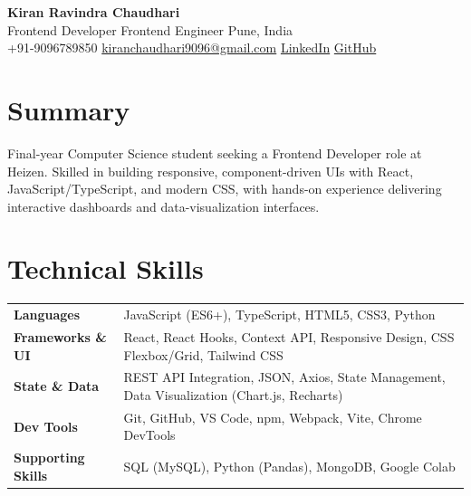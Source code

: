 \documentclass[10pt, letterpaper]{article}
\begin{document}
\pagestyle{empty}

\begin{center}
  {\fontsize{21}{25}\selectfont\bfseries\color{navy} Kiran Ravindra Chaudhari}\\[3pt]
  {\small\color{darkgray}%
    Frontend Developer \enspace\textbar\enspace
    Frontend Engineer \enspace\textbar\enspace
    Pune, India}\\[4pt]
  {\small
    +91-9096789850 \enspace\textbar\enspace
    \href{mailto:kiranchaudhari9096@gmail.com}{kiranchaudhari9096@gmail.com} \enspace\textbar\enspace
    \href{https://www.linkedin.com/in/kiran-chaudhari-10463925b}{LinkedIn} \enspace\textbar\enspace
    \href{https://github.com/Kiran2504}{GitHub}
  }
\end{center}


\section{Summary}

Final-year Computer Science student seeking a Frontend Developer role at Heizen. Skilled in building responsive, component-driven UIs with React, JavaScript/TypeScript, and modern CSS, with hands-on experience delivering interactive dashboards and data-visualization interfaces.

\section{Technical Skills}

\begin{tabularx}{\linewidth}{@{}>{\bfseries\small}p{3.8cm} X@{}}
Languages           & JavaScript (ES6+), TypeScript, HTML5, CSS3, Python \\[3pt]
Frameworks \& UI    & React, React Hooks, Context API, Responsive Design, CSS Flexbox/Grid, Tailwind CSS \\[3pt]
State \& Data       & REST API Integration, JSON, Axios, State Management, Data Visualization (Chart.js, Recharts) \\[3pt]
Dev Tools           & Git, GitHub, VS Code, npm, Webpack, Vite, Chrome DevTools \\[3pt]
Supporting Skills   & SQL (MySQL), Python (Pandas), MongoDB, Google Colab \\
\end{tabularx}
\end{document}
